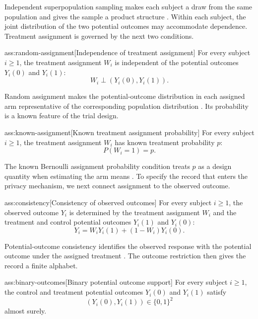 Independent superpopulation sampling makes each subject a draw from the same population and gives the sample a product structure \citep{OhnishiAwan2025}. Within each subject, the joint distribution of the two potential outcomes may accommodate dependence. Treatment assignment is governed by the next two conditions.

\begin{assumptionv}{ass:random-assignment}[Independence of treatment assignment]
For every subject \(i\ge1\), the treatment assignment \(W_i\) is independent of the potential outcomes \(Y_i(0)\) and \(Y_i(1)\):
\[
W_i\mathrel{\perp}(Y_i(0),Y_i(1)).
\]
\end{assumptionv}

Random assignment makes the potential-outcome distribution in each assigned arm representative of the corresponding population distribution \citep{OhnishiAwan2025}. Its probability is a known feature of the trial design.

\begin{assumptionv}{ass:known-assignment}[Known treatment assignment probability]
For every subject \(i\ge1\), the treatment assignment \(W_i\) has known treatment probability \(p\):
\[
P(W_i=1)=p.
\]
\end{assumptionv}

The known Bernoulli assignment probability condition treats \(p\) as a design quantity when estimating the arm means \citep{OhnishiAwan2025}. To specify the record that enters the privacy mechanism, we next connect assignment to the observed outcome.

\begin{assumptionv}{ass:consistency}[Consistency of observed outcomes]
For every subject \(i\ge1\), the observed outcome \(Y_i\) is determined by the treatment assignment \(W_i\) and the treatment and control potential outcomes \(Y_i(1)\) and \(Y_i(0)\):
\[
Y_i=W_iY_i(1)+(1-W_i)Y_i(0).
\]
\end{assumptionv}

Potential-outcome consistency identifies the observed response with the potential outcome under the assigned treatment \citep{OhnishiAwan2025}. The outcome restriction then gives the record a finite alphabet.

\begin{assumptionv}{ass:binary-outcomes}[Binary potential outcome support]
For every subject \(i\ge1\), the control and treatment potential outcomes \(Y_i(0)\) and \(Y_i(1)\) satisfy
\[
(Y_i(0),Y_i(1))\in\{0,1\}^2
\]
almost surely.
\end{assumptionv}

